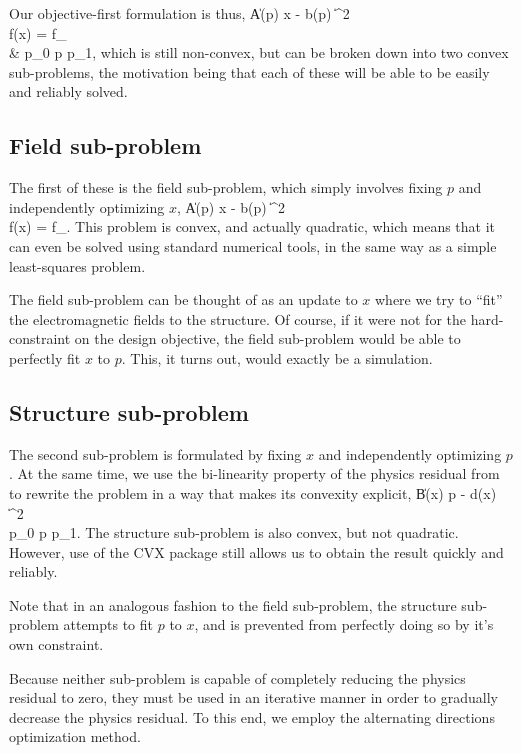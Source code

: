 Our objective-first formulation is thus,
\BA {} \| A(p) x - b(p) \|^2 \notag \\
    \subto f(x) = f_ \label{eq:ob1} \\
        & p_0 \le p \le p_1, \notag \EA
    which is still non-convex, but can be broken down into 
    two convex sub-problems, 
    the motivation being that each of these will be 
    able to be easily and reliably solved.

\subsection{Field sub-problem}
The first of these is the field sub-problem, 
    which simply involves fixing $p$ and independently optimizing $x$,
\BA {} \| A(p) x - b(p) \|^2 \label{eq:Fsub} \\
    \subto f(x) = f_. \notag \EA
This problem is convex, and actually quadratic,
    which means that it can even be solved 
    using standard numerical tools, in the same way 
    as a simple least-squares problem.

The field sub-problem can be thought of as an update to $x$
    where we try to ``fit'' the electromagnetic fields to the structure.
Of course, if it were not for the hard-constraint on the design objective,
    the field sub-problem would be able to perfectly fit $x$ to $p$.
This, it turns out, would exactly be a simulation.

\subsection{Structure sub-problem}
The second sub-problem is formulated by fixing $x$ and
    independently optimizing $p$.
At the same time, we use the bi-linearity property
    of the physics residual from 
    to rewrite the problem in a way that makes
    its convexity explicit,
\BA {} \| B(x) p - d(x) \|^2 \label{eq:Ssub} \\
    \subto p_0 \le p \le p_1. \notag \EA
The structure sub-problem is also convex, but not quadratic.
However, use of the CVX package still allows us to obtain the result
    quickly and reliably.

Note that in an analogous fashion to the field sub-problem,
    the structure sub-problem attempts to fit $p$ to $x$,
    and is prevented from perfectly doing so by it's own constraint.

Because neither sub-problem is capable of completely reducing the physics residual
    to zero, they must be used in an iterative manner in order to
    gradually decrease the physics residual.
To this end, we employ the alternating directions optimization method.

